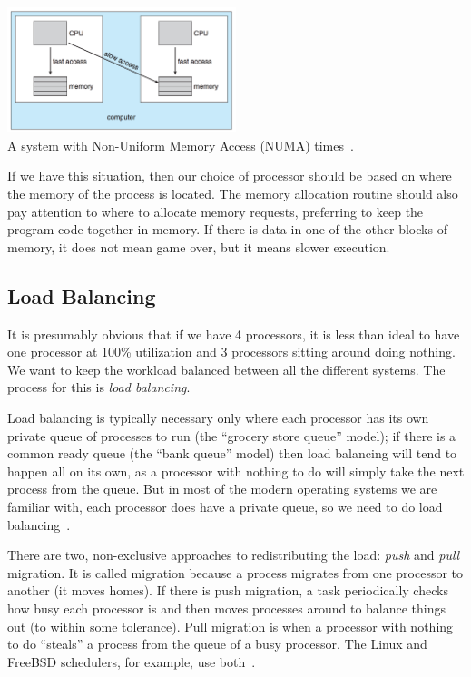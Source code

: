 \begin{center}
	\includegraphics[width=0.5\textwidth]{images/numa.png}\\
	A system with Non-Uniform Memory Access (NUMA) times~\cite{osc}.
\end{center}

If we have this situation, then our choice of processor should be based on where the memory of the process is located. The memory allocation routine should also pay attention to where to allocate memory requests, preferring to keep the program code together in memory. If there is data in one of the other blocks of memory, it does not mean game over, but it means slower execution.

\subsection*{Load Balancing}
It is presumably obvious that if we have 4 processors, it is less than ideal to have one processor at 100\% utilization and 3 processors sitting around doing nothing. We want to keep the workload balanced between all the different systems. The process for this is \textit{load balancing}.

Load balancing is typically necessary only where each processor has its own private queue of processes to run (the ``grocery store queue'' model); if there is a common ready queue (the ``bank queue'' model) then load balancing will tend to happen all on its own, as a processor with nothing to do will simply take the next process from the queue. But in most of the modern operating systems we are familiar with, each processor does have a private queue, so we need to do load balancing~\cite{osc}.

There are two, non-exclusive approaches to redistributing the load: \textit{push} and \textit{pull} migration. It is called migration because a process migrates from one processor to another (it moves homes). If there is push migration, a task periodically checks how busy each processor is and then moves processes around to balance things out (to within some tolerance). Pull migration is when a processor with nothing to do ``steals'' a process from the queue of a busy processor. The Linux and FreeBSD schedulers, for example, use both~\cite{osc}.

